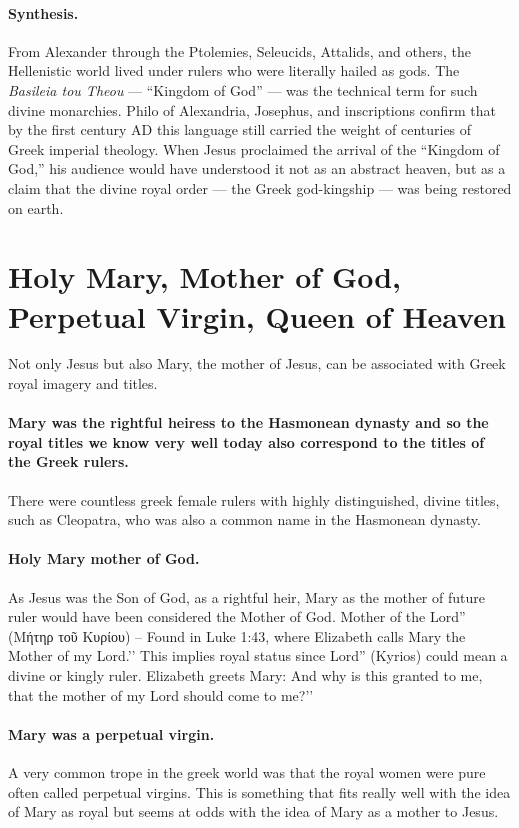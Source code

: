 \paragraph{Synthesis.}
From Alexander through the Ptolemies, Seleucids, Attalids, and others, the Hellenistic world lived under rulers who were literally hailed as gods.
The \textit{Basileia tou Theou} — “Kingdom of God” — was the technical term for such divine monarchies.
Philo of Alexandria, Josephus, and inscriptions confirm that by the first century AD this language still carried the weight of centuries of Greek imperial theology.
When Jesus proclaimed the arrival of the “Kingdom of God,” his audience would have understood it not as an abstract heaven, but as a claim that the divine royal order — the Greek god-kingship — was being restored on earth.

\section{Holy Mary, Mother of God, Perpetual Virgin, Queen of Heaven}\label{sec:holy-mary-mother-of-god-perpetual-virgin-queen-of-heaven}
Not only Jesus but also Mary, the mother of Jesus, can be associated with Greek royal imagery and titles.
\paragraph{Mary was the rightful heiress to the Hasmonean dynasty and so the royal titles we know very well today also correspond to the titles of the Greek rulers.}\label{par:mary-was-the-rightful-heiress-to-the-hasmonean-dynasty-and-so-the-royal-titles-we-know-very-well-today-also-correspond-to-the-titles-of-the-greek-rulers.}
There were countless greek female rulers with highly distinguished, divine titles, such as Cleopatra, who was also a common name in the Hasmonean dynasty.
\paragraph{Holy Mary mother of God.}\label{par:holy-mary-mother-of-god.}
As Jesus was the Son of God, as a rightful heir, Mary as the mother of future ruler would have been considered the Mother of God.
Mother of the Lord'' (Μήτηρ τοῦ Κυρίου) -- Found in Luke 1:43, where Elizabeth calls Mary the Mother of my Lord.’’ This implies royal status since Lord'' (Kyrios) could mean a divine or kingly ruler.
Elizabeth greets Mary: And why is this granted to me, that the mother of my Lord should come to me?’’
\paragraph{Mary was a perpetual virgin.}\label{par:mary-was-a-perpetual-virgin.}
A very common trope in the greek world was that the royal women were pure often called perpetual virgins.
This is something that fits really well with the idea of Mary as royal but seems at odds with the idea of Mary as a mother to Jesus.
